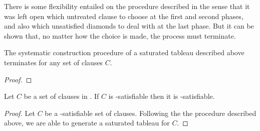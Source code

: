 There is some flexibility entailed on the procedure described in the sense that
it was left open which untreated clause to choose at the first and second
phases, and also which unsatisfied diamonds to deal with at the last phase. But
it can be shown that, no matter how the choice is made, the process must
terminate.

\begin{lemma}
    The systematic construction procedure of a saturated tableau described above
    terminates for any set of clauses $C$.
\end{lemma}
\begin{proof}
\end{proof}

\begin{theorem}
    Let $C$ be a set of clauses in . If $C$ is \ckn-satisfiable then it
    is -satisfiable.
\end{theorem}
\begin{proof}
    Let $C$ be a \ckn-satisfiable set of clauses. Following the the procedure
    described above, we are able to generate a saturated tableau for $C$. 
\end{proof}
